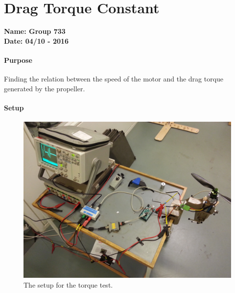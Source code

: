 \chapter{Drag Torque Constant}\label{app:TorqueTest} 
\textbf{Name: Group 733}\\
\textbf{Date: 04/10 - 2016}

\subsubsection{Purpose}
Finding the relation between the speed of the motor and the drag torque generated by the propeller.

\subsubsection{Setup}
\begin{figure}[H]
	\centering
	\includegraphics[scale=0.05,angle =-90]{figures/TorqueTestSetup}
	\caption{The setup for the torque test.}
	\label{TorqueTest}
\end{figure}


